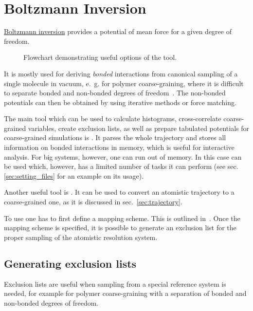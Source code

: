 \chapter{Boltzmann Inversion}

\hyperref[sec:bi]{Boltzmann inversion} provides a potential of mean force for a given degree of freedom. 
%
\begin{figure}
   \centering
   \caption{Flowchart demonstrating useful options of the tool.}
\end{figure}
%
It is mostly used for deriving {\em bonded} interactions from canonical sampling of a single molecule in vacuum, e.~g. for polymer coarse-graining, where it is difficult to separate bonded and non-bonded degrees of freedom~\cite{Tschoep:1998}. The non-bonded potentials can then be obtained by using iterative methods or force matching.

The main tool which can be used to calculate histograms, cross-correlate coarse-grained variables, create exclusion lists, as well as prepare tabulated potentials for coarse-grained simulations is . It parses the whole trajectory and stores all information on bonded interactions in memory, which is useful for interactive analysis. For big systems, however, one can run out of memory. In this case  can be used which, however, has a limited number of tasks it can perform (see sec. \ref{sec:setting_files} for an example on its usage).

Another useful tool is . It can be used to convert an atomistic trajectory to a coarse-grained one, as it is discussed in sec.~\ref{sec:trajectory}.

To use  one has to first define a mapping scheme. This is outlined in~. Once the mapping scheme is specified, it is possible to generate an exclusion list for the proper sampling of the atomistic resolution system.

\section{Generating exclusion lists}
\label{sec:exclusions}
Exclusion lists are useful when sampling from a special reference system is needed, for example for polymer coarse-graining with a separation of bonded and non-bonded degrees of freedom.

